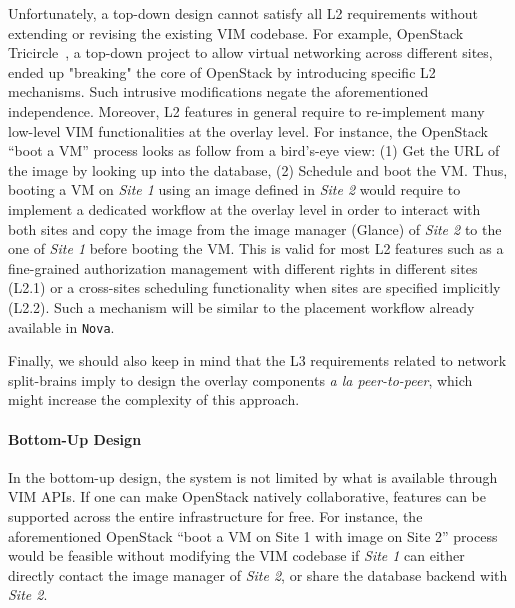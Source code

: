 Unfortunately, a top-down design cannot satisfy all L2 requirements
without extending or revising the existing VIM codebase. For example,
OpenStack Tricircle~\cite{tricircle}, a top-down project to allow
virtual networking across different sites, ended up "breaking" the
core of OpenStack by introducing specific L2 mechanisms. Such
intrusive modifications negate the aforementioned independence.
%
Moreover, L2 features in general require to
re-implement many low-level VIM functionalities at the overlay level. For
instance, the OpenStack ``boot a VM'' process looks as follow from a
bird's-eye view: (1) Get the URL of the image by looking up into the
database, (2) Schedule and boot the VM. Thus, booting a VM on
\emph{Site 1} using an image defined in \emph{Site 2} would require to
implement a dedicated workflow at the overlay level in order to
interact with both sites and copy the image from the image manager
(\ie Glance) of \emph{Site 2} to the one of \emph{Site 1} before booting the VM. 
%
This is valid for most L2 features such as a fine-grained
authorization management with different rights in different \edge
sites (L2.1) or a cross-sites scheduling functionality when sites are
specified implicitly (L2.2). Such a mechanism will be similar to the
placement workflow already available in \texttt{Nova}.

%
Finally, we should also keep in mind that the L3 requirements related
to network split-brains imply to design the overlay components \emph{a
  la peer-to-peer}, which might increase the complexity of this
approach.





\paragraph{Bottom-Up Design}
In the bottom-up design, the system is not limited by what is
available through VIM APIs. If one can make OpenStack natively
collaborative, features can be supported across the entire
\edge infrastructure for free. For instance, the aforementioned
OpenStack ``boot a VM on Site 1 with image on Site 2'' process would
be feasible without modifying the VIM codebase if \emph{Site 1} can
either directly contact the image manager of \emph{Site 2}, or share
the database backend with \emph{Site 2}.

